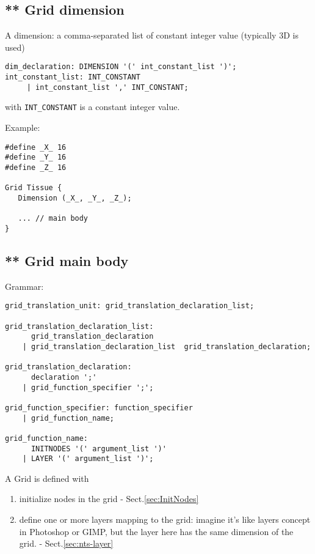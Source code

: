 \subsection{ ** Grid dimension}
\label{sec:GSL-grid-dimension}


A dimension: a comma-separated list of constant integer value
  (typically 3D is used)
  
\begin{verbatim}
dim_declaration: DIMENSION '(' int_constant_list ')';
int_constant_list: INT_CONSTANT 
     | int_constant_list ',' INT_CONSTANT;
\end{verbatim}
with \verb!INT_CONSTANT! is a constant integer value.

Example:
\begin{verbatim}
#define _X_ 16
#define _Y_ 16
#define _Z_ 16

Grid Tissue {
   Dimension (_X_, _Y_, _Z_);

   ... // main body
}
\end{verbatim}


\subsection{ ** Grid main body}
\label{sec:GSL-grid-body}

Grammar:
\begin{verbatim}
grid_translation_unit: grid_translation_declaration_list;

grid_translation_declaration_list: 
      grid_translation_declaration
	| grid_translation_declaration_list  grid_translation_declaration;
	
grid_translation_declaration: 
      declaration ';'
    | grid_function_specifier ';';
    
grid_function_specifier: function_specifier
    | grid_function_name;
    
grid_function_name: 
      INITNODES '(' argument_list ')'
    | LAYER '(' argument_list ')';
\end{verbatim}

A Grid is defined with
\begin{enumerate}
  \item initialize nodes in the grid - Sect.\ref{sec:InitNodes}
  

  \item define one or more layers mapping to the grid: imagine it's like layers
  concept in Photoshop or GIMP, but the layer here has the same dimension of the
  grid. - Sect.\ref{sec:nts-layer}

\end{enumerate}

